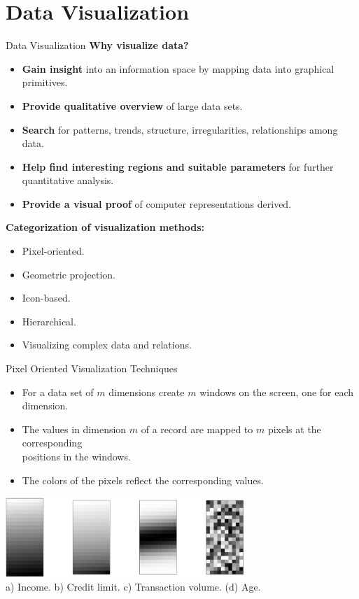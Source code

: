 \section{Data Visualization}

\begin{frame}{Data Visualization}
  \textbf{Why visualize data?}
  \begin{itemize}
  \item \textbf{Gain insight} into an information space by mapping data into graphical primitives.
  \item \textbf{Provide qualitative overview} of large data sets.
  \item \textbf{Search} for patterns, trends, structure, irregularities, relationships among data.
  \item \textbf{Help find interesting regions and suitable parameters} for further quantitative analysis.
  \item \textbf{Provide a visual proof} of computer representations derived.
  \end{itemize}
  \textbf{Categorization of visualization methods:}
  \begin{itemize}
  \item Pixel-oriented.
  \item Geometric projection.
  \item Icon-based.
  \item Hierarchical.
  \item Visualizing complex data and relations.
  \end{itemize}
\end{frame}

\begin{frame}{Pixel Oriented Visualization Techniques}
  \begin{itemize}
  \item For a data set of $m$ dimensions create $m$ windows on the screen, one for each dimension.
  \item The values in dimension $m$ of a record are mapped to $m$ pixels at the corresponding \\ positions in the windows.
  \item The colors of the pixels reflect the corresponding values.
  \end{itemize}
  \vspace{0.5cm}
  \centering
  \includegraphics[width=9cm]{img/pixel.jpg}\\
  a) Income. \hspace{0.3cm} b) Credit limit. \hspace{0.2cm} c) Transaction volume. \hspace{0.2cm} (d) Age.
\end{frame}


